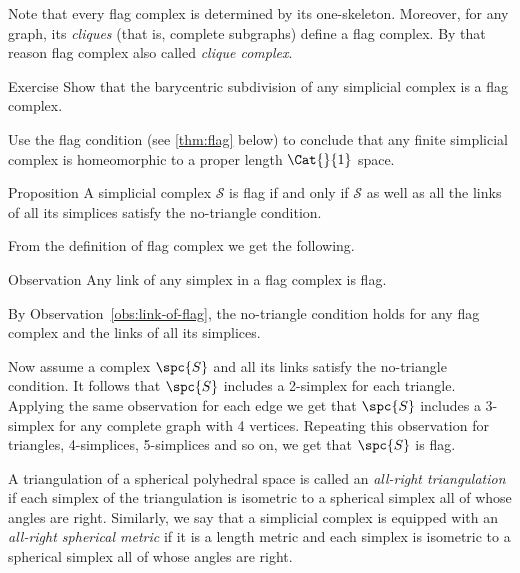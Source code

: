 Note that every flag complex is determined by its one-skeleton.
Moreover, for any graph, its \emph{cliques} (that is, complete subgraphs) define a flag complex.
By that reason flag complex also called \emph{clique complex}.

\begin{thm}{Exercise}\label{ex:baricenric-flag}
Show that the barycentric subdivision of any simplicial complex is a flag complex.

Use the flag condition (see \ref{thm:flag} below)
to conclude that any finite simplicial complex is homeomorphic to a proper length $\Cat{}{1}$ space.

\end{thm}


\begin{thm}{Proposition}\label{prop:no-trig}
A simplicial complex $\mathcal{S}$ is flag if and only if 
$\mathcal{S}$ as well as all the links of all its simplices
satisfy the no-triangle condition.
\end{thm}

From the definition of flag complex 
we get the following.

\begin{thm}{Observation}\label{obs:link-of-flag}
Any link of any simplex in a flag complex is flag.
\end{thm}


By Observation~\ref{obs:link-of-flag}, the no-triangle condition holds 
for any flag complex and the  links of all its simplices.

Now assume a complex $\spc{S}$ and all its links satisfy 
the no-triangle condition.
It follows that $\spc{S}$ includes a 2-simplex for each triangle.
Applying the same observation for each edge we get that $\spc{S}$ 
includes a 3-simplex for any complete graph with 4 vertices.
Repeating this observation 
for triangles, 
4-simplices,
5-simplices
and so on, we get that $\spc{S}$ is flag.
\qeds


A triangulation of a spherical polyhedral space 
is called an  \emph{all-right triangulation} 
if each simplex of the triangulation is isometric 
to a spherical simplex all of whose angles are right.
Similarly, we say that a simplicial complex 
is equipped with an  \emph{all-right spherical metric}
if it is a length metric and each simplex is isometric 
to a spherical simplex all of whose angles are right.

